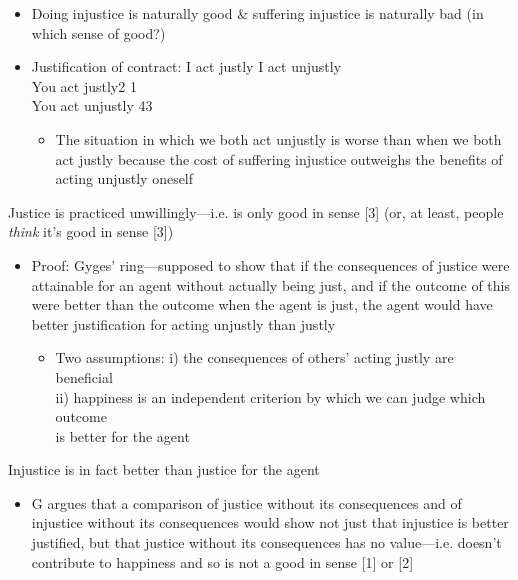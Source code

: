 \documentclass[11pt]{article}
\begin{document}
\begin{itemize}\item{Doing injustice is naturally good \& suffering injustice is naturally bad (in which sense of good?)}\item{Justification of contract: I act justly\hspace*{5mm} I act unjustly\\\hspace*{14mm} You act justly\hspace*{8mm}2\hspace*{20mm} 1\\\hspace*{14mm}You act unjustly\hspace*{4mm} 4\hspace*{21mm}3}\begin{itemize}\item{The situation in which we both act unjustly is worse than when we both act justly because the cost of suffering injustice outweighs the benefits of acting unjustly oneself}\end{itemize}
\end{itemize}

\noindent Justice is practiced unwillingly---i.e. is only good in sense [3] (or, at least, people \emph{think} it's good in sense [3])
\begin{itemize}\item{Proof: Gyges' ring---supposed to show that if the consequences of justice were attainable for an agent without actually being just, and if the outcome of this were better than the outcome when the agent is just, the agent would have better justification for acting unjustly than justly}\begin{itemize}\item{Two assumptions: i) the consequences of others' acting justly are beneficial\\\hspace*{28mm}ii) happiness is an independent criterion by which we can judge which outcome\\\hspace*{32mm}is better for the agent}\end{itemize}\end{itemize}

\noindent Injustice is in fact better than justice for the agent

\begin{itemize}\item{G argues that a comparison of justice without its consequences and of injustice without its consequences would show not just that injustice is better justified, but that justice without its consequences has no value---i.e. doesn't contribute to happiness and so is not a good in sense [1] or [2]}\end{itemize}
\vspace*{-8mm}
\end{document}
